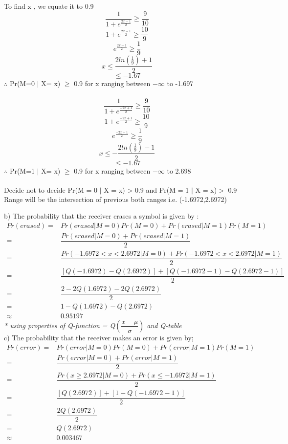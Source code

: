 \documentclass{article}
\begin{document}
\begin{enumerate}
  To find x , we equate it to 0.9\\
  $$ \frac{1}{1+e^\frac{{2x-1}}{2}} \geq \frac{9}{10}$$
  $$1+e^\frac{{2x-1}}{2} \geq \frac{10}{9}$$
  $$e^\frac{2x-1}{2} \geq \frac{1}{9}$$
  $$ x \leq \frac{2ln(\frac{1}{9})+1}{2}$$
  $$    \leq -1.67 $$
  $\therefore$  Pr(M=0  $ | $ X= x) $\geq$ 0.9 for x ranging between $-\infty$ to -1.697 \\ \\

  $$ \frac{1}{1+e^\frac{{-2x+1}}{2}} \geq \frac{9}{10}$$
  $$1+e^\frac{{-2x+1}}{2} \geq \frac{10}{9}$$
  $$e^\frac{-2x+1}{2} \geq \frac{1}{9}$$
  $$ x \leq -\frac{2ln(\frac{1}{9})-1}{2}$$
  $$ \leq -1.67 $$
  $\therefore$  Pr(M=1  $ | $ X= x) $\geq$ 0.9 for x ranging between $-\infty$ to 2.698\\ \\

  Decide not to decide Pr(M = 0 $|$ X = x) > 0.9 and Pr(M = 1 $|$ X = x)$ >$ 0.9
  Range will be the intersection of previous both ranges i.e. (-1.6972,2.6972)


  b) The probability that the receiver erases a symbol is given by :
  \begin{align*}
    Pr(erased) =& Pr(erased|M = 0)Pr(M = 0)+Pr(erased|M = 1)Pr(M = 1)\\
    =& \dfrac{Pr(erased|M = 0) + Pr(erased|M = 1)}{2}\\
    =& \dfrac{Pr(-1.6972 < x< 2.6972|M = 0) + Pr(-1.6972 < x< 2.6972|M = 1)}{2}\\
    =& \dfrac{[Q(-1.6972)-Q(2.6972)] + [Q(-1.6972-1)-Q(2.6972-1)]}{2}\\
    =& \dfrac{2-2Q(1.6972)-2Q(2.6972)}{2}\\
    =& 1-Q(1.6972)-Q(2.6972)\\
    \approx& 0.95197
  \end{align*}
  \textit{* using properties of Q-function = Q$\left(\dfrac{x-\mu}{\sigma}\right)$ and Q-table}\\

  c)  The probability that the receiver makes an error is given by;
  \begin{align*}
    Pr(error) =& Pr(error|M = 0)Pr(M = 0)+Pr(error|M = 1)Pr(M = 1)\\
    =& \dfrac{Pr(error|M = 0) + Pr(error|M = 1)}{2}\\
    =& \dfrac{Pr(x \geq 2.6972|M = 0) + Pr(x \leq -1.6972|M = 1)}{2}\\
    =& \dfrac{[Q(2.6972)] + [1-Q(-1.6972-1)]}{2}\\
    =& \dfrac{2Q(2.6972)}{2}\\
    =& Q(2.6972)\\
    \approx& 0.003467
  \end{align*}


\end{enumerate}
\end{document}
